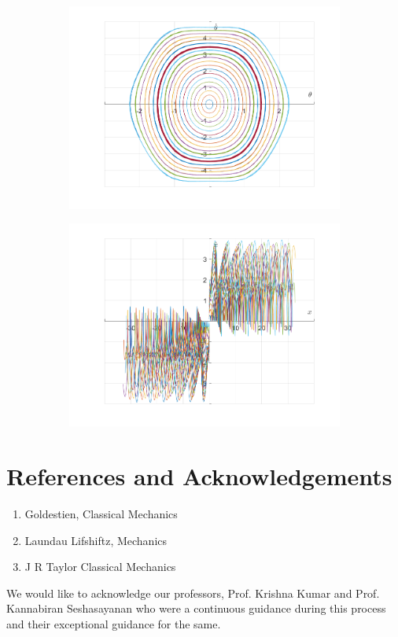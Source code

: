 \documentclass{article}
\begin{document}
	\begin{figure}[h!]
		\centering
		\begin{subfigure}[b]{0.48\linewidth}
			\includegraphics[width=\linewidth]{./SmallOscillations/Chaotic/F5.png}
		\end{subfigure}
		\begin{subfigure}[b]{0.48\linewidth}
			\includegraphics[width=\linewidth]{./SmallOscillations/Chaotic/F6.png}
		\end{subfigure}
	\end{figure}
	\newpage
	
\section*{References and Acknowledgements}
\begin{enumerate}
\item Goldestien, Classical Mechanics
\item Laundau Lifshiftz, Mechanics
\item J R Taylor Classical Mechanics
\end{enumerate}
We would like to acknowledge our professors, Prof. Krishna Kumar and Prof. Kannabiran Seshasayanan who were a continuous guidance during this process and their exceptional guidance for the same.
\end{document}
